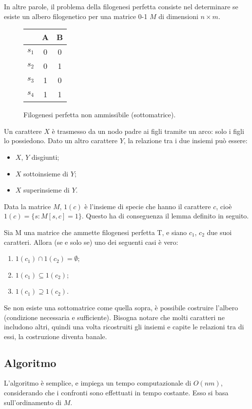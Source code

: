 In altre parole, il problema della filogenesi perfetta consiste nel determinare se esiste un albero filogenetico per una matrice 0-1 $M$ di dimensioni $n\times m$.
\begin{figure}[H]
	\begin{center}
		\begin{tabular}{l | c | c}
			~	& A & B \\ \hline
			$s_1$ & 0 & 0 \\
			$s_2$ & 0 & 1 \\
			$s_3$ & 1 & 0 \\
			$s_4$ & 1 & 1
		\end{tabular}
	\end{center}
\caption{Filogenesi perfetta non ammissibile (sottomatrice).}
\end{figure}
Un carattere $X$ è trasmesso da un nodo padre ai figli tramite un arco: solo i figli lo possiedono. Dato un altro carattere $Y$, la relazione tra i due insiemi può essere:
\begin{itemize}
	\item $X$, $Y$ disgiunti;
	\item $X$ sottoinsieme di $Y$;
	\item $X$ superinsieme di $Y$. 
\end{itemize}
Data la matrice $M$, $1(c)$ è l'insieme di specie che hanno il carattere $c$, cioè $1(c) = \{s : M[s, c] = 1\}$. Questo ha di conseguenza il lemma definito in seguito.

\begin{lemma}
	Sia M una matrice che ammette filogenesi perfetta T, e siano $c_1$, $c_2$ due suoi caratteri. Allora (se e solo se) uno dei seguenti casi è vero:
\begin{enumerate}
	\item $1(c_1) \cap 1(c_2) = \emptyset$;
	\item $1(c_1) \subseteq 1(c_2)$;
	\item $1(c_1) \supseteq 1(c_2)$.
\end{enumerate}
\end{lemma}

Se non esiste una sottomatrice come quella sopra, è possibile costruire l'albero (condizione necessaria e sufficiente). Bisogna notare che molti caratteri ne includono altri, quindi una volta ricostruiti gli insiemi e capite le relazioni tra di essi, la costruzione diventa banale.

\subsection{Algoritmo}
L'algoritmo è semplice, e impiega un tempo computazionale di $O(nm)$, considerando che i confronti sono effettuati in tempo costante. Esso si basa sull'ordinamento di $M$.

